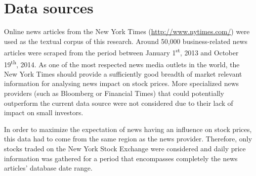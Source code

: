 \documentclass{article}
\begin{document}
\section{Data sources}
Online news articles from the New York Times (\url{http://www.nytimes.com/}) were used as the textual corpus of this research. Around 50,000 business-related news articles were scraped from the period between January 1\textsuperscript{st}, 2013 and October 19\textsuperscript{th}, 2014. As one of the most respected news media outlets in the world, the New York Times should provide a sufficiently good breadth of market relevant information for analysing news impact on stock prices. More specialized news providers (such as Bloomberg or Financial Times) that could potentially outperform the current data source were not considered due to their lack of impact on small investors.
\par
In order to maximize the expectation of news having an influence on stock prices, this data had to come from the same region as the news provider. Therefore, only stocks traded on the New York Stock Exchange were considered and daily price information was gathered for a period that encompasses completely the news articles' database date range.
\end{document}

